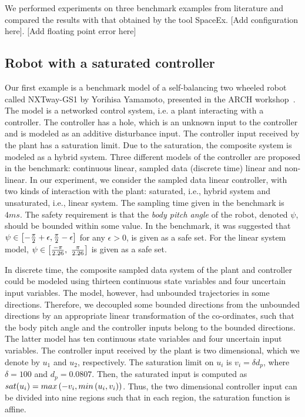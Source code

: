We performed experiments on three benchmark examples from literature
and compared the results with that obtained by the tool SpaceEx. [Add
  configuration here]. [Add floating point error here]


\subsection{Robot with a saturated controller}   Our first example is a benchmark
model of a self-balancing two wheeled robot called NXTway-GS1 by
Yorihisa Yamamoto, presented in the ARCH
workshop~\cite{heinz2014benchmark}.  The model is a networked control
system, i.e. a plant interacting with a controller.  The controller
has a hole, which is an unknown input to the controller and is modeled
as an additive disturbance input.  The controller input received by
the plant has a saturation limit.  Due to the saturation, the
composite system is modeled as a hybrid system.  Three different
models of the controller are proposed in the benchmark: continuous
linear, sampled data (discrete time) linear and non-linear.  In our
experiment, we consider the sampled data linear controller, with two
kinds of interaction with the plant: saturated, i.e., hybrid system
and unsaturated, i.e., linear system.  The sampling time given in the
benchmark is $4 ms$.  The safety requirement is that the \emph{body
  pitch angle} of the robot, denoted $\psi$, should be bounded within
some value. In the benchmark, it was suggested that
$\psi\in\left[-\frac{\pi}{2}+\epsilon,\frac{\pi}{2}-\epsilon\right]$ for
any $\epsilon>0$, is given as a safe set.  For the linear system
model, $\psi\in\left[\frac{-\pi}{2.26},~\frac{\pi}{2.26}\right]$ is given
as a safe set.


In discrete time, the composite sampled data system of the plant and
controller could be modeled using thirteen continuous state variables
and four uncertain input variables.  The model, however, had unbounded
trajectories in some directions.  Therefore, we decoupled some bounded
directions from the unbounded directions by an appropriate linear
transformation of the co-ordinates, such that the body pitch angle and
the controller inputs belong to the bounded directions.  The latter
model has ten continuous state variables and four uncertain input
variables. The controller input received by the plant is two
dimensional, which we denote by $u_1$ and $u_2$, respectively.  The
saturation limit on $u_i$ is $v_i=\delta d_p$, where $\delta=100$ and
$d_p=0.0807$.  Then, the saturated input is computed as $sat(u_i) =
max\left(-v_i,min\left(u_i,v_i\right)\right)$.  Thus, the two dimensional
controller input can be divided into nine regions such that in each
region, the saturation function is affine.

